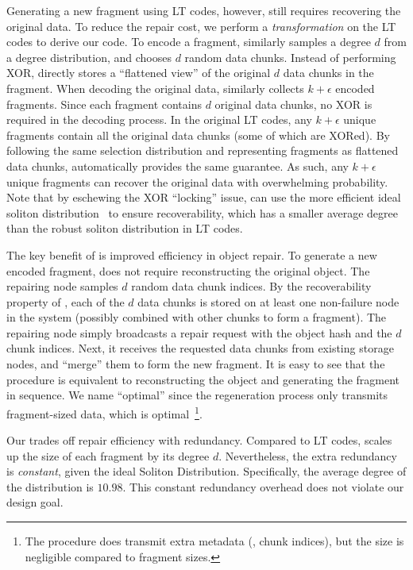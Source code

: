 Generating a new fragment using LT codes, however, still requires recovering the original data.
To reduce the repair cost, we perform a \emph{transformation} on the LT codes to derive our \code code.
To encode a fragment, \code similarly samples a degree $d$ from a degree distribution, and chooses $d$ random data chunks.
Instead of performing XOR, \code directly stores a ``flattened view'' of the original $d$ data chunks in the fragment.
When decoding the original data, \code similarly collects $k + \epsilon$ encoded fragments.
Since each fragment contains $d$ original data chunks, no XOR is required in the decoding process.
In the original LT codes, any $k + \epsilon$ unique fragments contain all the original data chunks (some of which are XORed).
By following the same selection distribution and representing fragments as flattened data chunks, \code automatically provides the same guarantee.
As such, any $k + \epsilon$ unique \code fragments can recover the original data with overwhelming probability.
Note that by eschewing the XOR ``locking'' issue, \code can use the more efficient ideal soliton distribution~\cite{ltcodes} to ensure recoverability, which has a smaller average degree than the robust soliton distribution in LT codes.

The key benefit of \code is improved efficiency in object repair.
To generate a new encoded fragment, \code does not require reconstructing the original object.
The repairing node samples $d$ random data chunk indices.
By the recoverability property of \code, each of the $d$ data chunks is stored on at least one non-failure node in the system (possibly combined with other chunks to form a fragment).
The repairing node simply broadcasts a repair request with the object hash and the $d$ chunk indices.
Next, it receives the requested data chunks from existing storage nodes, and ``merge'' them to form the new fragment.
It is easy to see that the procedure is equivalent to reconstructing the object and generating the fragment in sequence.
We name \code ``optimal'' since the regeneration process only transmits fragment-sized data, which is optimal~\footnote{The procedure does transmit extra metadata (\eg, chunk indices), but the size is negligible compared to fragment sizes.}.

Our \code trades off repair efficiency with redundancy.
Compared to LT codes, \code scales up the size of each fragment by its degree $d$.
Nevertheless, the extra redundancy is \emph{constant}, given the ideal Soliton Distribution.
Specifically, the average degree of the distribution is $10.98$.
This constant redundancy overhead does not violate our design goal.

